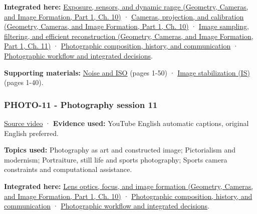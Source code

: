 \textbf{Integrated here:} \href{../03-Geometry-Cameras-and-Image-Formation-P01/main.pdf\#03-visual-computing-i-ch003-exposure-sensors-and-dynamic-range}{Exposure, sensors, and dynamic range (Geometry, Cameras, and Image Formation, Part 1, Ch. 10)} · \href{../03-Geometry-Cameras-and-Image-Formation-P01/main.pdf\#03-visual-computing-i-ch003-cameras-projection-and-calibration}{Cameras, projection, and calibration (Geometry, Cameras, and Image Formation, Part 1, Ch. 10)} · \href{../03-Geometry-Cameras-and-Image-Formation-P01/main.pdf\#03-visual-computing-i-ch004-image-sampling-filtering-and-efficient-reconstruction}{Image sampling, filtering, and efficient reconstruction (Geometry, Cameras, and Image Formation, Part 1, Ch. 11)} · \hyperref[04-visual-computing-ii-ch034-photographic-composition-history-and-communication]{Photographic composition, history, and communication} · \hyperref[04-visual-computing-ii-ch034-photographic-workflow-and-integrated-decisions]{Photographic workflow and integrated decisions}.

\textbf{Supporting materials:} \href{https://drive.google.com/open?id=0B6w2XfPHEcZYS2xETmR4SVlIczg}{Noise and ISO} (pages 1-50) · \href{https://drive.google.com/open?id=0B6w2XfPHEcZYcFpESFU4dEM3QkE}{Image stabilization (IS)} (pages 1-40).

\subsubsection{PHOTO-11 - Photography session 11}\label{04-visual-computing-ii-ch036-photo-11---photography-session-11}

\hypertarget{04-visual-computing-ii-ch036-photo-11---photography-session-11}{}

\href{https://www.youtube.com/watch?v=AaJz5RMtO4c}{Source video} · \textbf{Evidence used:} YouTube English automatic captions, original English preferred.

\textbf{Topics used:} Photography as art and constructed image; Pictorialism and modernism; Portraiture, still life and sports photography; Sports camera constraints and computational assistance.

\textbf{Integrated here:} \href{../03-Geometry-Cameras-and-Image-Formation-P01/main.pdf\#03-visual-computing-i-ch003-lens-optics-focus-and-image-formation}{Lens optics, focus, and image formation (Geometry, Cameras, and Image Formation, Part 1, Ch. 10)} · \hyperref[04-visual-computing-ii-ch034-photographic-composition-history-and-communication]{Photographic composition, history, and communication} · \hyperref[04-visual-computing-ii-ch034-photographic-workflow-and-integrated-decisions]{Photographic workflow and integrated decisions}.

